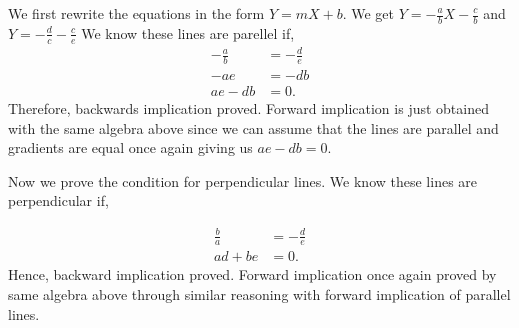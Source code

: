 \begin{solution}
  We first rewrite the equations in the form \( Y = mX + b \).
  We get \( Y = -\frac{a}{b}X - \frac{c}{b} \) and \( Y  = -\frac{d}{c} - \frac{c}{e}\)
  We know these lines are parellel if,
  \begin{align*}
    -\frac{a}{b} &= -\frac{d}{e} \\
    -ae &= -db \\
    ae - db &= 0
  .\end{align*}
  Therefore, backwards implication proved. Forward implication is just obtained 
  with the same algebra above since we can assume that the lines are parallel and gradients are equal once again giving us \( ae - db = 0 \).

  Now we prove the condition for perpendicular lines. We know these lines
  are perpendicular if,

  \begin{align*}
    \frac{b}{a} &= -\frac{d}{e} \\
  ad + be &= 0 
  .\end{align*}
  Hence, backward implication proved. Forward implication
  once again proved by same algebra above through similar reasoning with
  forward implication of parallel lines.
\end{solution}



